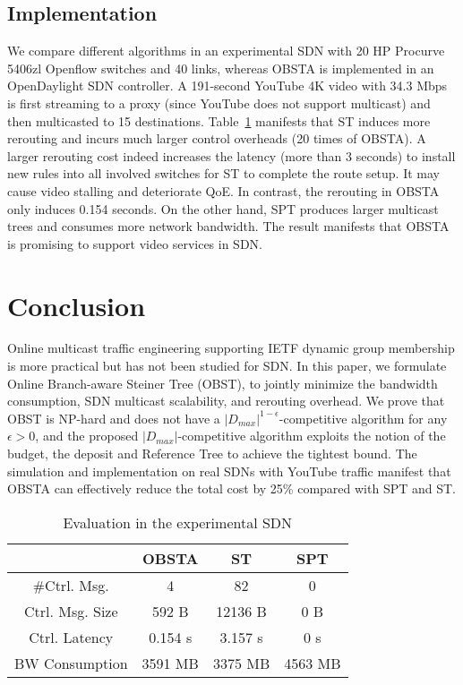 \documentclass[10pt, conference, letterpaper]{IEEEtran}
\theoremstyle{definition}
\begin{document}
\subsection{Implementation}
We compare different algorithms in an experimental SDN with 20 HP Procurve 5406zl Openflow switches and 40 links, whereas OBSTA is implemented in an OpenDaylight SDN controller. A 191-second YouTube 4K video with 34.3 Mbps is first streaming to a proxy (since YouTube does not support multicast) and then multicasted to 15 destinations. Table~\ref{t:implementation} manifests that ST induces more rerouting and incurs much larger control overheads (20 times of OBSTA). A larger rerouting cost indeed increases the latency (more than 3 seconds) to install new rules into all involved switches for ST to complete the route setup. It may cause video stalling and deteriorate QoE. In contrast, the rerouting in OBSTA only induces 0.154 seconds. On the other hand, SPT produces larger multicast trees and consumes more network bandwidth. The result manifests that OBSTA is promising to support video services in SDN.



\section{Conclusion} \label{sec: conclusion}

Online multicast traffic engineering supporting IETF dynamic group membership is more practical but has not been studied for SDN. In this paper, we formulate Online Branch-aware Steiner Tree (OBST), to jointly minimize the bandwidth consumption, SDN multicast scalability, and rerouting overhead. We prove that OBST is NP-hard and does not have a $|D_{max}|^{1-\epsilon}$-competitive algorithm for any $\epsilon >0$, and the proposed $|D_{max}|$-competitive algorithm exploits the notion of the budget, the deposit and Reference Tree to achieve the tightest bound. 
The simulation and implementation on real SDNs with YouTube traffic manifest that
OBSTA can effectively reduce the total cost by 25\% compared with SPT and ST.


\begin{table}[t!]
\caption{Evaluation in the experimental SDN}
\begin{center}
\begin{tabular}{cccc}
\hline
 & OBSTA & ST & SPT \\
\hline
\#Ctrl. Msg. & 4 & 82 & 0 \\
\hline
Ctrl. Msg. Size & 592 B & 12136 B & 0 B \\
\hline
Ctrl. Latency & 0.154 s & 3.157 s & 0 s \\
\hline
BW Consumption & 3591 MB & 3375 MB & 4563 MB  \\
\hline
\end{tabular}
\label{t:implementation}
\end{center}
\end{table}
\end{document}
